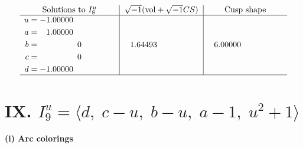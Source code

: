 \documentclass[1p]{elsarticle_modified}
\theoremstyle{definition}
\newcommand{\I}{\sqrt{-1}}
\begin{document}
$$\begin{array}{c|c|c}  
\text{Solutions to }I^u_{8}& \I (\text{vol} + \sqrt{-1}CS) & \text{Cusp shape}\\
 \hline 
\begin{aligned}
u &= -1.00000\phantom{ +0.000000I} \\
a &= \phantom{-}1.00000\phantom{ +0.000000I} \\
b &= \phantom{-0.000000 } 0 \\
c &= \phantom{-0.000000 } 0 \\
d &= -1.00000\phantom{ +0.000000I}\end{aligned}
 & \phantom{-}1.64493\phantom{ +0.000000I} & \phantom{-}6.00000\phantom{ +0.000000I}\\
 \hline 
 \end{array}$$\newpage\newpage\renewcommand{\arraystretch}{1}
\centering \section*{IX. $I^u_{9}= \langle d,\;c- u,\;b- u,\;a-1,\;u^2+1 \rangle$}
\flushleft \textbf{(i) Arc colorings}\\
\end{document}
